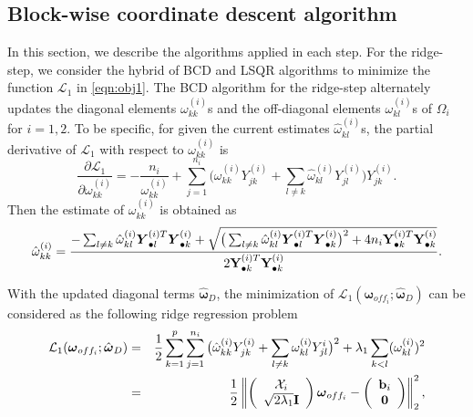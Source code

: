 \documentclass[useAMS,usenatbib,referee]{bio}
\newcommand{\bs}{\boldsymbol}
\begin{document}
{{\subsection{Block-wise coordinate descent algorithm}

In this section, we describe the algorithms applied in each step.
For the ridge-step, we consider the hybrid of BCD and LSQR algorithms to minimize the function ${\mathcal L}_1$ in \eqref{eqn:obj1}.
The BCD algorithm for the ridge-step alternately updates the diagonal elements ${\omega}^{(i)}_{kk}$s and the off-diagonal elements ${\omega}^{(i)}_{kl}$s of $\Omega_i$ for $i=1,2$.
To be specific, for given the current estimates $\hat{\omega}^{(i)}_{kl}$s, the partial derivative of ${\mathcal L}_1$ with respect to ${\omega}^{(i)}_{kk}$ is
\begin{equation} \label{eqn:pd_diag} \nonumber
\frac{\partial {\mathcal L}_1}{\partial \omega^{(i)}_{kk}}
= -\frac{n_i}{\omega^{(i)}_{kk}} 
+ \sum_{j=1}^{n_i}\big( \omega_{kk}^{(i)} Y^{(i)}_{jk}  + \sum_{l \neq k}  \hat{\omega}^{(i)}_{kl} {Y}_{jl}^{(i)} \big) {Y}_{jk}^{(i)}  .
\end{equation}
Then the estimate of ${\omega}^{(i)}_{kk}$ is obtained as
\begin{equation} \label{eqn:diag} \nonumber
\hat{\omega}^{(i)}_{kk} = 
\frac{ - \sum_{l \neq k} \hat{\omega}_{kl}^{(i)} \bs{Y}_{\bullet l}^{(i) T} \bs{Y}_{\bullet k}^{(i)} + 
\sqrt{\big(\sum_{l \neq k} \hat{\omega}_{kl}^{(i)} \bs{Y}_{\bullet l}^{(i) T} \bs{Y}_{\bullet k}^{(i)} \big)^2 +  4n_i {\bf Y}_{\bullet k}^{(i) T} {\bf Y}_{\bullet k}^{(i)}}}{2 {\bf Y}_{\bullet k}^{(i)T} {\bf Y}_{\bullet k}^{(i)}}. 
\end{equation}


With the updated diagonal terms $\hat{\bs{\omega}}_D$, the minimization of ${\mathcal L}_1(\bs{\omega}_{off_i};\hat{\bs{\omega}}_D)$ can be considered as the following ridge regression problem
\begin{eqnarray} \label{obj:ridge}
{\mathcal L}_1(\bs{\omega}_{off_i};\hat{\bs{\omega}}_D) &=&
\displaystyle \frac{1}{2} \sum_{k=1}^p \sum_{j=1}^{n_i}
\big(\hat{\omega}^{(i)}_{kk} Y_{jk}^{(i)} + \sum_{l\neq k} \omega^{(i)}_{kl} Y_{jl}^i
\big)^2 + \lambda_1 \sum_{k<l} (\omega^{(i)}_{kl})^2\\ \label{eqn:lsqr}
&=& \displaystyle
\frac{1}{2}
\left\|  
\begin{pmatrix}
\begin{array}{c}
{\mathcal X}_i\\
\sqrt{2\lambda_1} {\bf I}
\end{array}
\end{pmatrix}
\bs{\omega}_{off_i} - 
\begin{pmatrix}
\begin{array}{c}
{\bf b}_i\\
{\bf 0}
\end{array}
\end{pmatrix}
\right\|_2^2,
\end{eqnarray}

}}
\end{document}
